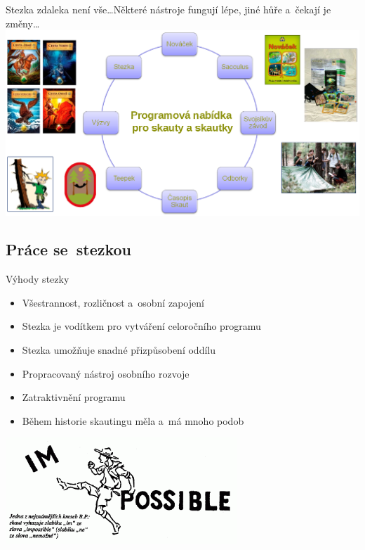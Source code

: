 \documentclass[compress, ucs, xelatex, 11pt, xcolor=dvipsnames, print,
	hyperref={
		bookmarks=true,
		unicode=true,
		colorlinks=true,
		pdftitle={Skautska vychovna metoda},
		plainpages=false,
		pdfauthor={Vojtech Zeisek},
		pdfsubject={Skautska vychovna metoda a jeji vyvoj za posledni stoleti a desetileti},
		pdfcreator={XeLaTeX},
		pdfkeywords={Junak, Pedagogika, Skaut, Skauting, Vychovna metoda},
		linkcolor=Black,
		anchorcolor=Black,
		citecolor=OliveGreen,
		filecolor=OliveGreen,
		menucolor=Black,
		urlcolor=OliveGreen,
		pdftex},
	url={hyphens, lowtilde} %
	]{beamer}
\begin{document}
\begin{frame}{Stezka zdaleka není vše\ldots}{Některé nástroje fungují lépe, jiné hůře a~čekají je změny\ldots}
	\includegraphics[width=\textwidth]{komplet.png}
\end{frame}

\subsection{Práce se~stezkou}

\begin{frame}{Výhody stezky}
	\begin{itemize}
		\item Všestrannost, rozličnost a~osobní zapojení
		\item Stezka je vodítkem pro vytváření celoročního programu
		\item Stezka umožňuje snadné přizpůsobení oddílu
		\item Propracovaný nástroj osobního rozvoje
		\item Zatraktivnění programu
		\item Během historie skautingu měla a~má mnoho podob
	\end{itemize}
	\begin{center}
		\includegraphics[height=4cm]{im-possible_m.png}
	\end{center}
\end{frame}
\end{document}
